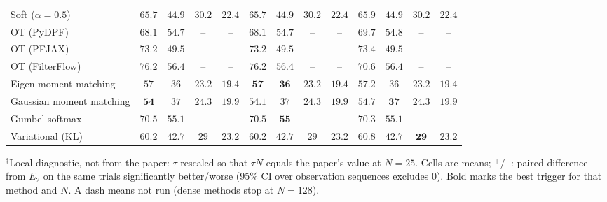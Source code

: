 \begin{table}[ht]
\begin{adjustbox}{max width=\linewidth}
\begin{tabular}{lcccc|cccc|cccc}
Soft ($\alpha{=}0.5$) & $\mathbf{65.7}$ & $\mathbf{44.9}$ & $\mathbf{30.2}$ & $\mathbf{22.4}$ & $\mathbf{65.7}$ & $\mathbf{44.9}$ & $\mathbf{30.2}$ & $\mathbf{22.4}$ & $65.9$ & $44.9$ & $\mathbf{30.2}$ & $\mathbf{22.4}$ \\
OT (PyDPF) & $68.1$ & $54.7$ & -- & -- & $\mathbf{68.1}$ & $\mathbf{54.7}$ & -- & -- & $69.7$ & $54.8$ & -- & -- \\
OT (PFJAX) & $\mathbf{73.2}$ & $49.5$ & -- & -- & $\mathbf{73.2}$ & $49.5$ & -- & -- & $73.4$ & $\mathbf{49.5}$ & -- & -- \\
OT (FilterFlow) & $76.2$ & $\mathbf{56.4}$ & -- & -- & $76.2$ & $56.4$ & -- & -- & $\mathbf{70.6}$ & $56.4$ & -- & -- \\
Eigen moment matching & $57$ & $36$ & $23.2$ & $\mathbf{19.4}$ & $\mathbf{57}$ & $\mathbf{36}$ & $\mathbf{23.2}$ & $\mathbf{19.4}$ & $57.2$ & $36$ & $23.2$ & $\mathbf{19.4}$ \\
Gaussian moment matching & $\mathbf{54}$ & $37$ & $\mathbf{24.3}$ & $\mathbf{19.9}$ & $54.1$ & $37$ & $24.3$ & $\mathbf{19.9}$ & $54.7$ & $\mathbf{37}$ & $24.3$ & $19.9$ \\
Gumbel-softmax & $70.5$ & $55.1$ & -- & -- & $70.5$ & $\mathbf{55}$ & -- & -- & $\mathbf{70.3}$ & $55.1$ & -- & -- \\
Variational (KL) & $\mathbf{60.2}$ & $42.7$ & $29$ & $23.2$ & $60.2$ & $42.7$ & $29$ & $23.2$ & $60.8$ & $\mathbf{42.7}$ & $\mathbf{29}$ & $\mathbf{23.2}$ \\
\bottomrule
\end{tabular}
\end{adjustbox}
\par\smallskip\parbox{0.95\linewidth}{\footnotesize $^\dagger$Local diagnostic, not from the paper: $\tau$ rescaled so that $\tau N$ equals the paper's value at $N{=}25$. Cells are means; $^{+}$/$^{-}$: paired difference from $E_2$ on the same trials significantly better/worse (95\% CI over observation sequences excludes 0). Bold marks the best trigger for that method and $N$. A dash means not run (dense methods stop at $N{=}128$).}
\end{table}

